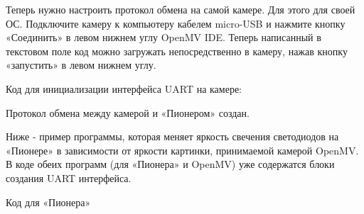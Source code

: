 \documentclass[a4paper,10pt,russian]{sphinxmanual}
\begin{document}
Теперь нужно настроить протокол обмена на самой камере. Для этого  для своей ОС. Подключите камеру к компьютеру кабелем micro-USB и нажмите кнопку «Соединить» в левом нижнем углу OpenMV IDE. Теперь написанный в текстовом поле код можно загружать непосредственно в камеру, нажав кнопку «запустить» в левом нижнем углу.

Код для инициализации интерфейса  UART на камере:

%
\begin{sphinxVerbatim}[commandchars=\\\{\}]
  
    
\end{sphinxVerbatim}

Протокол обмена между камерой и «Пионером» создан.

Ниже - пример программы, которая меняет яркость свечения светодиодов на «Пионере» в зависимости от яркости картинки, принимаемой камерой OpenMV.
В коде обеих программ (для «Пионера» и OpenMV) уже содержатся блоки создания UART интерфейса.

Код для «Пионера»
\end{document}
